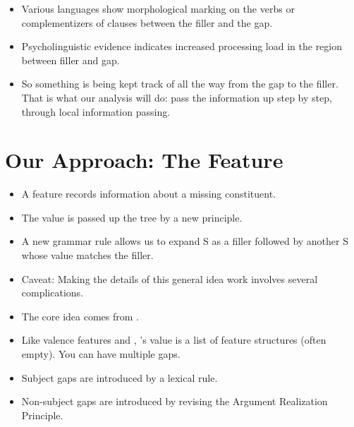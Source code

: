 \documentclass[a4paper,landscape,headrule,footrule]{foils}
\begin{document}






\begin{itemize}
\item Various languages show morphological marking
on the verbs or complementizers of clauses
between the filler and the gap.
\item Psycholinguistic evidence indicates increased
processing load in the region between filler and
gap.
\item So something is being kept track of all the way from the gap
  to the filler.  That is what our analysis will do: pass the
  information up step by step, through local information passing.
\end{itemize}

\section{Our Approach: The Feature }

\begin{itemize}
\item A feature  records information about a
missing constituent.
\item The  value is passed up the tree by a new
principle.
\item A new grammar rule allows us to expand S as a filler
followed by another S whose  value
matches the filler.
\item Caveat: Making the details of this general
idea work involves several complications.
\item The core idea comes from \citet{Gazdar:1981}.
\end{itemize}



\begin{itemize}
\item Like valence features and , ’s
value is a list of feature structures (often
empty).  You can have multiple gaps.
\item Subject gaps are introduced by a lexical rule.
\item Non-subject gaps are introduced by revising
the Argument Realization Principle.
\end{itemize}
\end{document}
